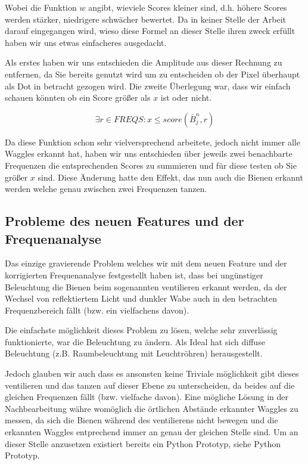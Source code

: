 \documentclass[11pt,a4paper]{article}
\begin{document}
Wobei die Funktion $w$ angibt, wieviele Scores kleiner sind, d.h. höhere Scores werden stärker, niedrigere schwächer bewertet. Da in keiner Stelle der Arbeit darauf eingegangen wird, wieso diese Formel an dieser Stelle ihren zweck erfüllt haben wir uns etwas einfacheres ausgedacht.

Als erstes haben wir uns entschieden die Amplitude aus dieser Rechnung zu entfernen, da Sie bereits genutzt wird um zu entscheiden ob der Pixel überhaupt als Dot in betracht gezogen wird. Die zweite Überlegung war, dass wir einfach schauen könnten ob ein Score größer als $x$ ist oder nicht.

\begin{center}
\begin{equation} 
\exists r\in FREQS : x\le score(\bar{B}_j^n, r)
\end{equation}
\end{center}

Da diese Funktion schon sehr vielversprechend arbeitete, jedoch nicht immer alle Waggles erkannt hat, haben wir uns entschieden über jeweils zwei benachbarte Frequenzen die entsprechenden Scores zu summieren und für diese testen ob Sie größer $x$ sind. Diese Änderung hatte den Effekt, das nun auch die Bienen erkannt werden welche genau zwischen zwei Frequenzen tanzen.

\subsection{Probleme des neuen Features und der Frequenanalyse}
Das einzige gravierende Problem welches wir mit dem neuen Feature und der korrigierten Frequenanalyse festgestellt haben ist, dass bei ungünstiger Beleuchtung die Bienen beim sogenannten ventilieren erkannt werden, da der Wechsel von reflektiertem Licht und dunkler Wabe auch in den betrachten Frequenzbereich fällt (bzw. ein vielfachens davon).

Die einfachste möglichkeit dieses Problem zu lösen, welche sehr zuverlässig funktionierte, war die Beleuchtung zu ändern. Als Ideal hat sich diffuse Beleuchtung (z.B. Raumbeleuchtung mit Leuchtröhren) herausgestellt.

Jedoch glauben wir auch dass es ansonsten keine Triviale möglichkeit gibt dieses ventilieren und das tanzen auf dieser Ebene zu unterscheiden, da beides auf die gleichen Frequenzen fällt (bzw. vielfache davon). Eine mögliche Lösung in der Nachbearbeitung währe womöglich die örtlichen Abstände erkannter Waggles zu messen, da sich die Bienen während des ventilierens nicht bewegen und die erkannten Waggles entprechend immer an genau der gleichen Stelle sind. Um an dieser Stelle anzusetzen existiert bereits ein Python Prototyp, siehe Python Prototyp.
\end{document}
